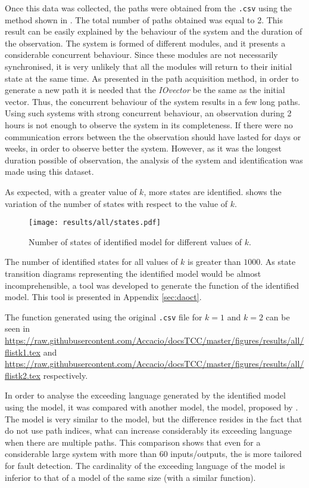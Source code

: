 Once this data was collected, the paths were obtained from the \verb|.csv| using
the method shown in . The total number of paths obtained was equal to
2. This result can be easily explained by the behaviour of the system and the
duration of the observation. The
system is formed of different modules, and it presents a considerable concurrent behaviour. Since these modules are not necessarily
synchronised, it is very unlikely that all the modules will return to their initial
state at the same time. As presented in the path acquisition method, in order to generate
a new path it is needed that the \emph{IOvector} be the same as the initial
vector. Thus, the concurrent behaviour of the system results in a few long
paths. Using such systems with strong concurrent behaviour, an observation
during 2 hours is not enough
to observe the system in its completeness. If there were no communication errors
between the \PLCs{} the observation should have lasted for days or weeks, in order
to observe better the system. However, as it was the longest duration possible
of observation, the analysis of the system and identification was made using
this dataset.

As expected, with a greater value of $k$, more states are identified. 
 shows the variation of the number of
states with respect to the value of $k$.
\begin{figure}[H]
  \centering
  \texttt{[image: results/all/states.pdf]}
  \caption{Number of states of identified model for different values of $k$.}
    \label{fig:statesIdentOriginal}
\end{figure}

The number of identified states for all values of $k$ is greater than $1000$. As
state transition diagrams representing the identified model would be almost
incomprehensible, a tool was developed to generate the \ffunction{} function of
the identified model. This tool is presented in Appendix \ref{sec:daoct}.

The \ffunction{} function generated using the original \verb|.csv| file
for $k=1$ and $k=2$
can be seen in  
\url{https://raw.githubusercontent.com/Accacio/docsTCC/master/figures/results/all/flistk1.tex}
and
\url{https://raw.githubusercontent.com/Accacio/docsTCC/master/figures/results/all/flistk2.tex}
respectively.

In order to analyse the exceeding language generated by the
identified model using the \DAOCT{} model, it was compared with another model, the \NDAAO{} model, proposed by
\cite{klein2005fault}. The \NDAAO{} model is very similar to the \DAOCT{} model,
but the difference resides in the fact that \NDAAO{} do not use path indices,
what can increase considerably its exceeding language when there are multiple paths. This comparison shows that even for a considerable
large system with more than 60 inputs\slash outputs, the \DAOCT{} is more
tailored for fault detection. The cardinality of the exceeding language of the
\DAOCT{} model is
inferior to that of a \NDAAO{} model of the same size (with a similar \ffunction{} function).

